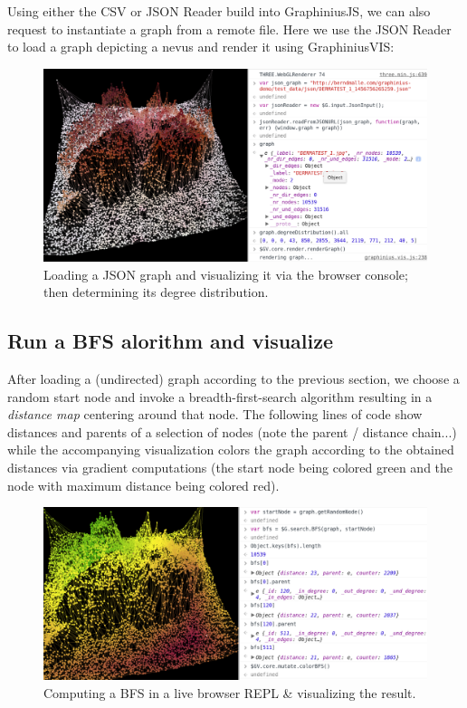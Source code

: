 	Using either the CSV or JSON Reader build into GraphiniusJS, we can also request to instantiate a graph from a remote file. Here we use the JSON Reader to load a graph depicting a nevus and render it using GraphiniusVIS:
	
	\begin{figure}[H]
		\begin{center}
			\includegraphics [width=1\textwidth] {figures/loadingGraphInREPL}
			\caption{Loading a JSON graph and visualizing it via the browser console; then determining its degree distribution.}
			\label{fig:load_graph_repl}
		\end{center}
	\end{figure}
	
	
	\subsection{Run a BFS alorithm and visualize}
	\label{ssect:run_bfs_visualize}
	
	After loading a (undirected) graph according to the previous section, we choose a random start node and invoke a breadth-first-search algorithm resulting in a \textit{distance map} centering around that node. The following lines of code show distances and parents of a selection of nodes (note the parent / distance chain...) while the accompanying visualization colors the graph according to the obtained distances via gradient computations (the start node being colored green and the node with maximum distance being colored red).
	
	\begin{figure}[H]
		\begin{center}
			\includegraphics [width=1\textwidth] {figures/colorBFSREPL}
			\caption{Computing a BFS in a live browser REPL \& visualizing the result.}
			\label{fig:color_graph_bfs}
		\end{center}
	\end{figure}
	
